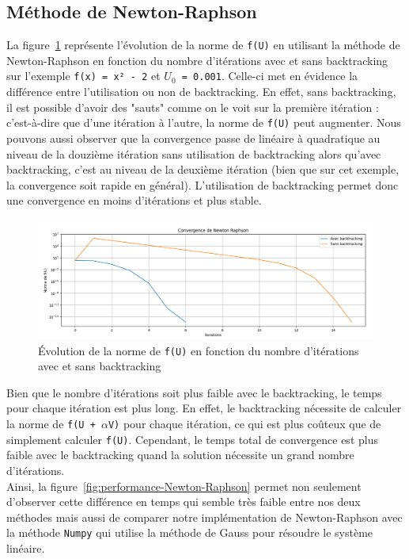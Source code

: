 \documentclass{article}
\begin{document}
\subsection{Méthode de Newton-Raphson}
La figure~\ref{fig:Newton-Raphson} représente l'évolution de la norme de \texttt{f(U)} en utilisant la méthode de Newton-Raphson en fonction du nombre d'itérations avec et sans backtracking sur l'exemple \texttt{f(x) = x² - 2} et \texttt{$U_{0}$ = 0.001}. Celle-ci met en évidence la différence entre l'utilisation ou non de backtracking. En effet, sans backtracking, il est possible d'avoir des "sauts" comme on le voit sur la première itération : c'est-à-dire que d'une itération à l'autre, la norme de \texttt{f(U)} peut augmenter. Nous pouvons aussi observer que la convergence passe de linéaire à quadratique au niveau de la douzième itération sans utilisation de backtracking alors qu'avec backtracking, c'est au niveau de la deuxième itération (bien que sur cet exemple, la convergence soit rapide en général). L'utilisation de backtracking permet donc une convergence en moins d'itérations et plus stable. 
\begin{figure}[H]
  \centering
  \includegraphics[width=1\textwidth]{convergence_comparison.png}
  \caption{Évolution de la norme de \texttt{f(U)} en fonction du nombre d'itérations avec et sans backtracking}
  \label{fig:Newton-Raphson}
\end{figure}
Bien que le nombre d'itérations soit plus faible avec le backtracking, le temps pour chaque itération est plus long. En effet, le backtracking nécessite de calculer la norme de \texttt{f(U + $\alpha$V)} pour chaque itération, ce qui est plus coûteux que de simplement calculer \texttt{f(U)}. Cependant, le temps total de convergence est plus faible avec le backtracking quand la solution nécessite un grand nombre d'itérations. \\
Ainsi, la figure~\ref{fig:performance-Newton-Raphson} permet non seulement d'observer cette différence en temps qui semble très faible entre nos deux méthodes mais aussi de comparer notre implémentation de Newton-Raphson avec la méthode \texttt{Numpy} qui utilise la méthode de Gauss pour résoudre le système linéaire. 
\end{document}
